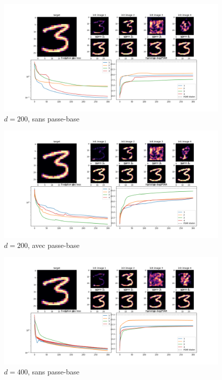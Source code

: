 \documentclass[hidelinks, french]{article} %
\theoremstyle{enonce}
\theoremstyle{special}
\theoremstyle{rq}
\theoremstyle{exo}
\theoremstyle{demo}
\begin{document}
\begin{figure}[H]\centering
\includegraphics[width=1\textwidth]{../resultats/LGD/differents latents/lat-s_200_fig.png}
\caption{$d=200$, sans passe-base}
\label{fig:LGD comp_size g}
\end{figure}

\begin{figure}[H]\centering
	\includegraphics[width=1\textwidth]{../resultats/LGD/differents latents/lat-g_200_fig.png}
	\caption{$d=200$, avec passe-base}
	\label{fig:LGD comp_size g}
\end{figure}

\begin{figure}[H]\centering
\includegraphics[width=1\textwidth]{../resultats/LGD/differents latents/lat-s_400_fig.png}
\caption{$d=400$, sans passe-base}
\label{fig:LGD comp_size g}
\end{figure}
\end{document}
